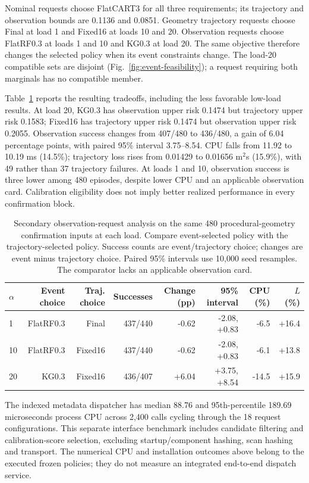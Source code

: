 Nominal requests choose FlatCART3 for all three requirements; its trajectory and observation bounds are 0.1136 and 0.0851. Geometry trajectory requests choose Final at load 1 and Fixed16 at loads 10 and 20. Observation requests choose FlatRF0.3 at loads 1 and 10 and KG0.3 at load 20. The same objective therefore changes the selected policy when its event constraints change. The load-20 compatible sets are disjoint (Fig.~\ref{fig:event-feasibility}); a request requiring both marginals has no compatible member.

Table~\ref{tab:dispatchoutcomes} reports the resulting tradeoffs, including the less favorable low-load results. At load 20, KG0.3 has observation upper risk 0.1474 but trajectory upper risk 0.1583; Fixed16 has trajectory upper risk 0.1474 but observation upper risk 0.2055. Observation success changes from 407/480 to 436/480, a gain of 6.04 percentage points, with paired 95\% interval 3.75--8.54. CPU falls from 11.92 to 10.19 ms (14.5\%); trajectory loss rises from 0.01429 to 0.01656 m$^2$s (15.9\%), with 49 rather than 37 trajectory failures. At loads 1 and 10, observation success is three lower among 480 episodes, despite lower CPU and an applicable observation card. Calibration eligibility does not imply better realized performance in every confirmation block.
\begin{table}[!htbp]\centering\scriptsize
\caption{Secondary observation-request analysis on the same 480 procedural-geometry confirmation inputs at each load. Compare event-selected policy with the trajectory-selected policy. Success counts are event/trajectory choice; changes are event minus trajectory choice. Paired 95\% intervals use 10,000 seed resamples. The comparator lacks an applicable observation card.}\label{tab:dispatchoutcomes}
\begin{tabular}{@{}lrrrrrrr@{}}\toprule
$\alpha$ & Event choice & Traj. choice & Successes & Change (pp) & 95\% interval & CPU (\%) & $L$ (\%)\\\midrule
1 & FlatRF0.3 & Final & 437/440 & -0.62 & -2.08, +0.83 & -6.5 & +16.4\\
10 & FlatRF0.3 & Fixed16 & 437/440 & -0.62 & -2.08, +0.83 & -6.1 & +13.8\\
20 & KG0.3 & Fixed16 & 436/407 & +6.04 & +3.75, +8.54 & -14.5 & +15.9\\
\bottomrule\end{tabular}\end{table}

The indexed metadata dispatcher has median 88.76 and 95th-percentile 189.69 microseconds process CPU across 2,400 calls cycling through the 18 request configurations. This separate interface benchmark includes candidate filtering and calibration-score selection, excluding startup/component hashing, scan hashing and transport. The numerical CPU and installation outcomes above belong to the executed frozen policies; they do not measure an integrated end-to-end dispatch service.

